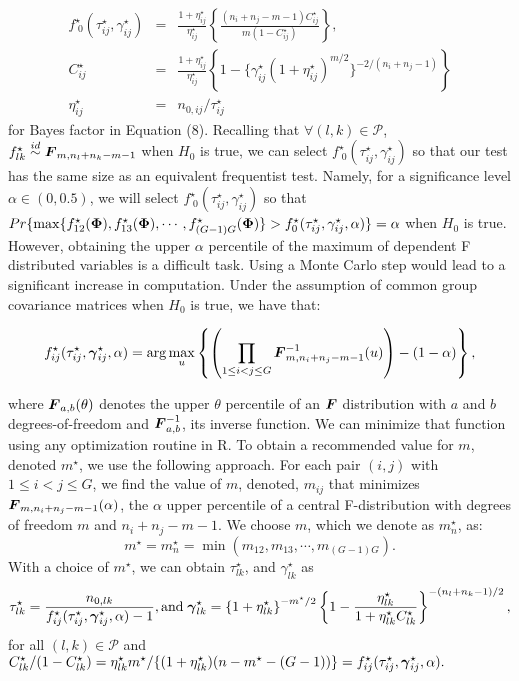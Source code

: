 \documentclass[]{article}
\def\be{\begin{eqnarray}}
\def\ee{\end{eqnarray}}
\newcommand{\uF}       {\mbox{\boldmath$F$}}
\newcommand{\ugamma}            {\mbox{\boldmath$\gamma$}}
\newcommand{\uPhi}              {\mbox{\boldmath$\Phi$}}
\begin{document}
\be
    f^{\star}_{\;0}(\tau^{\star}_{ij},\gamma^{\star}_{ij}) &=&\frac{1+\eta^{\star}_{ij}}{\eta^{\star}_{ij}} \left\{ \frac{(n_i +n_j - m - 1)C^{\star}_{ij}}{m(1 - C^{\star}_{ij})} \right\},\nonumber \\
    C^{\star}_{ij} &=& \frac{1+\eta^{\star}_{ij}}{\eta^{\star}_{ij}}\left\{ 1 - \{\gamma^{\star}_{ij}(1+\eta^{\star}_{ij})^{m/2} \}^{-2/(n_i+n_j-1)}  \right\} \nonumber \\
    \eta^{\star}_{ij} &=& n_{0,ij}/\tau^{\star}_{ij}
\ee
for Bayes factor in Equation (8).
Recalling that $\forall (l,k) \in \mathcal{P}$, $f^{\star}_{lk} \stackrel{id}{\sim} \uF_{m, n_l +n_k - m-1}$ when $H_0$ is true, we can select $f^{\star}_{\;0}(\tau^{\star}_{ij},\gamma^{\star}_{ij})$ so that our test has the same size as an equivalent frequentist test. Namely, for a significance level $\alpha \in (0, 0.5)$, we will select $f^{\star}_{\;0}(\tau^{\star}_{ij},\gamma^{\star}_{ij})$ so that 
$Pr\{\max\{f^{\star}_{12}(\uPhi), f^{\star}_{13}(\uPhi), \cdots, f^{\star}_{(G-1)G}(\uPhi)\} > f^{\star}_{0}(\tau^{\star}_{ij},\gamma^{\star}_{ij}, \alpha)\} = \alpha$ when $H_{0}$ is true. However, obtaining the upper $\alpha$ percentile of the maximum of dependent F distributed variables is a difficult task. Using a Monte Carlo step would lead to a significant increase in computation. Under the assumption of common group covariance matrices when $H_0$ is true, we have that: 

$$
f^{\star}_{ij}(\tau^{\star}_{ij},\ugamma^{\star}_{ij}, \alpha) = \arg\max_{u} \left\{ \left(\prod_{1 \leq i < j \leq G} \uF^{-1}_{m, n_i+n_j-m-1}(u) \right) -(1-\alpha) \right\}  ,$$

where $\uF_{a, b}(\theta)$ denotes the upper $\theta$ percentile of an $\uF$ distribution with $a$ and $b$ degrees-of-freedom and $\uF^{-1}_{a, b}$, its inverse function. We can minimize that function using any optimization routine in R. 
To obtain a recommended value for $m$, denoted $m^{\star}$, we use the following approach. For each pair $(i, j)$ with $1 \leq i < j \leq G$, we find the value of $m$, denoted, $m_{ij}$ that minimizes $\uF_{m, n_i+n_j-m-1}(\alpha)$, the $\alpha$ upper percentile of a central F-distribution with degrees of freedom $m$ and $n_i+n_j-m-1$. We choose $m$, which we denote as $m^{\star}_{n}$, as: 
$$
m^{\star} = m^{\star}_{n}  = \min\left( m_{12}, m_{13}, \cdots, m_{(G-1)G} \right).
$$
With a choice of $m^{\star}$, we can obtain $\tau^{\star}_{lk}$, and $\gamma^{\star}_{lk}$ as
$$
\tau^{\star}_{lk} = \frac{n_{0,lk}}{f^{\star}_{ij}(\tau^{\star}_{ij},\ugamma^{\star}_{ij}, \alpha) - 1}, \mbox{and}\; 
\ugamma^{\star}_{lk} = \left\{ 1 + \eta^{\star}_{lk}\right\}^{-m^{\star}/2}\left\{ 1 - \frac{\eta^{\star}_{lk}}{1 + \eta^{\star}_{lk} C^{\star}_{lk}} \right\}^{-(n_l+n_k -1)/2}, \nonumber
$$
for all $(l,k) \in \mathcal{P}$ and ${C^{\star}_{lk}}/{(1 - C^{\star}_{lk})} = { \eta^{\star}_{lk} m^{\star}}/\{(1+ \eta^{\star}_{lk})(n - m^{\star} -(G-1))\}=f^{\star}_{ij}(\tau^{\star}_{ij},\ugamma^{\star}_{ij}, \alpha).$ 
\end{document}
